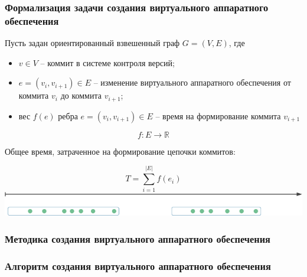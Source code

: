 \begin{frame}%
    \frametitle{Формализация задачи создания виртуального аппаратного обеспечения}
    Пусть задан ориентированный взвешенный граф $G = (V,E)$,
    где

    \begin{itemize}
        \item $v \in V$ -- коммит в системе контроля версий;
        \item $e=(v_i,v_{i+1}) \in E$ -- изменение виртуального
            аппаратного обеспечения от коммита $v_i$ до коммита $v_{i+1}$;
        \item вес $f(e)$ ребра $e=(v_i,v_{i+1}) \in E$ -- время на формирование коммита $v_{i+1}$
    \end{itemize}
    \begin{equation}
        f : E \rightarrow \mathbb{R}
    \end{equation}

    Общее время, затраченное на формирование цепочки коммитов:

    \begin{equation}
        T = \sum_{i=1}^{|E|} f(e_i)
    \end{equation}
    \includegraphics[width=\linewidth,valign=t]{images/commit-graph.png}
\end{frame}


\begin{frame}%
    \frametitle{Методика создания виртуального аппаратного обеспечения}
    \begin{figure}[!htbp]
        \hspace*{-5cm}
        \scalebox{0.7}{
            
        }
    \end{figure}
\end{frame}


\begin{frame}%
    \frametitle{Алгоритм создания виртуального аппаратного обеспечения}
    \begin{figure}[!htbp]
        \hspace*{-5cm}
        \scalebox{0.56}{
            
        }
    \end{figure}
\end{frame}




